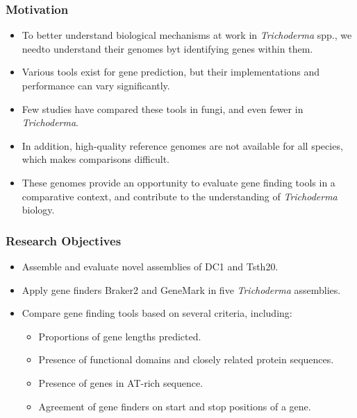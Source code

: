 \documentclass[t]{beamer}
\begin{document}
\begin{frame}
	\frametitle{Motivation} 
	\begin{itemize}
		\item To better understand biological mechanisms at work in \textit{Trichoderma} spp., we needto understand their genomes byt identifying genes within them.
		\item Various tools exist for gene prediction, but their implementations and performance can vary significantly.
		\item Few studies have compared these tools in fungi, and even fewer in \textit{Trichoderma}.
		\item In addition, high-quality reference genomes are not available for all species, which makes comparisons difficult.
		\item These genomes provide an opportunity to evaluate gene finding tools in a comparative context, and contribute to the understanding of \textit{Trichoderma} biology. 
	\end{itemize}
\end{frame}

\begin{frame}
	\frametitle{Research Objectives}
	\begin{itemize}
		\item Assemble and evaluate novel assemblies of DC1 and Tsth20.
		\item Apply gene finders Braker2 and GeneMark in five \textit{Trichoderma} assemblies.
		\item Compare gene finding tools based on several criteria, including:
		\begin{itemize}
			 \item Proportions of gene lengths predicted.
			 \item Presence of functional domains and closely related protein sequences.
			 \item Presence of genes in AT-rich sequence.
			 \item Agreement of gene finders on start and stop positions of a gene. 
		\end{itemize}
	\end{itemize}
\end{frame}
\end{document}
